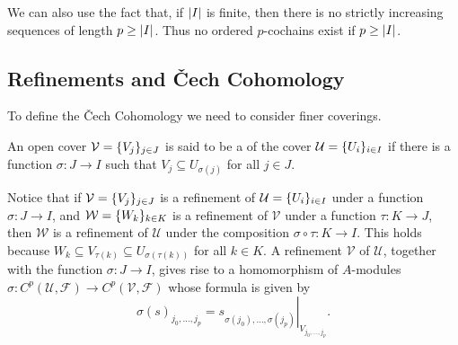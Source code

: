 We can also use the fact that, if $\lvert I\rvert$ is finite, then there is no strictly increasing sequences of length $p \geq \lvert I\rvert$. Thus no ordered $p$-cochains exist if $p \geq \lvert I\rvert$.

\subsection*{Refinements and Čech Cohomology}

To define the Čech Cohomology we need to consider finer coverings.
\begin{definition}
	An open cover $\mathcal{V} = \lbrace V_j\rbrace_{j \in J}$ is said to be a  of the cover $\mathcal{U} = \lbrace U_i\rbrace_{i \in I}$ if there is a function $\sigma\colon J \to I$ such that $V_j \subseteq U_{\sigma(j)}$ for all $j \in J$.
\end{definition}

Notice that if $\mathcal{V} = \lbrace V_j\rbrace_{j \in J}$ is a refinement of $\mathcal{U} = \lbrace U_i\rbrace_{i \in I}$ under a function $\sigma\colon J \to I$, and $\mathcal{W} = \lbrace W_k\rbrace_{k \in K}$ is a refinement of $\mathcal{V}$ under a function $\tau \colon K \to J$, then $\mathcal{W}$ is a refinement of $\mathcal{U}$ under the composition $\sigma\circ\tau \colon K \to I$. This holds because $W_{k} \subseteq V_{\tau(k)} \subseteq U_{\sigma(\tau(k))}$ for all $k \in K$. A refinement $\mathcal{V}$ of $\mathcal{U}$, together with the function $\sigma\colon J \to I$, gives rise to a homomorphism of $A$-modules $\sigma \colon C^p(\mathcal{U}, \mathcal{F}) \to C^p(\mathcal{V}, \mathcal{F})$ whose formula is given by
\begin{equation*}
	\sigma(s)_{j_0, \dotsc, j_p} = \left. s_{\sigma(j_0), \dotsc, \sigma(j_p)}\right|_{V_{j_0, \dotsc, j_p}}.
\end{equation*}

